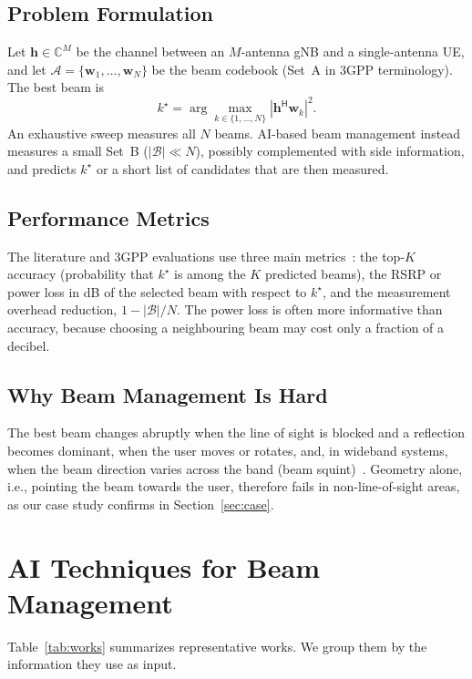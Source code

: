 \documentclass[journal]{IEEEtran}
\begin{document}
\subsection{Problem Formulation}
Let $\mathbf{h}\in\mathbb{C}^{M}$ be the channel between an $M$-antenna gNB and a single-antenna UE, and let $\mathcal{A}=\{\mathbf{w}_1,\dots,\mathbf{w}_N\}$ be the beam codebook (Set~A in 3GPP terminology). The best beam is
\begin{equation}
k^\star=\arg\max_{k\in\{1,\dots,N\}} \left|\mathbf{h}^{\mathsf H}\mathbf{w}_k\right|^2 .
\end{equation}
An exhaustive sweep measures all $N$ beams. AI-based beam management instead measures a small Set~B ($|\mathcal{B}|\ll N$), possibly complemented with side information, and predicts $k^\star$ or a short list of candidates that are then measured.

\subsection{Performance Metrics}
The literature and 3GPP evaluations use three main metrics~\cite{3gpp38843,xue2023standard}: the top-$K$ accuracy (probability that $k^\star$ is among the $K$ predicted beams), the RSRP or power loss in dB of the selected beam with respect to $k^\star$, and the measurement overhead reduction, $1-|\mathcal{B}|/N$. The power loss is often more informative than accuracy, because choosing a neighbouring beam may cost only a fraction of a decibel.

\subsection{Why Beam Management Is Hard}
The best beam changes abruptly when the line of sight is blocked and a reflection becomes dominant, when the user moves or rotates, and, in wideband systems, when the beam direction varies across the band (beam squint)~\cite{heng2021six}. Geometry alone, i.e., pointing the beam towards the user, therefore fails in non-line-of-sight areas, as our case study confirms in Section~\ref{sec:case}.

\section{AI Techniques for Beam Management}
\label{sec:ai}
Table~\ref{tab:works} summarizes representative works. We group them by the information they use as input.
\end{document}
